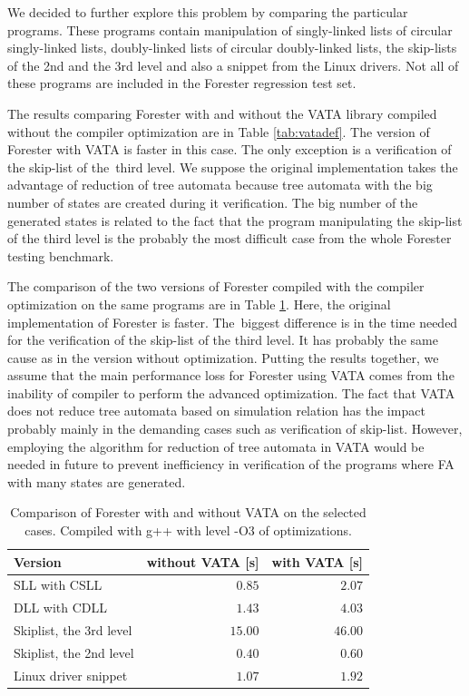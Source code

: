 We decided to further explore this problem by comparing
the particular programs.
These programs contain manipulation of singly-linked lists of
circular singly-linked lists, doubly-linked lists of
circular doubly-linked lists, the skip-lists of the 2nd and
the 3rd level and also a snippet from the Linux drivers.
Not all of these programs are included in the Forester regression test set.

The results comparing Forester with and without the VATA library compiled
without the compiler optimization are in Table \ref{tab:vatadef}.
The version of Forester with VATA is faster in this case.
The only exception is a verification of the skip-list of the~third
level.
We suppose the original implementation takes the advantage of
reduction of tree automata because tree automata
with the big number of states are created during it verification.
The big number of the generated states is related to the fact
that the program manipulating the skip-list of the third level
is the probably the most difficult case from the whole Forester testing benchmark.

The comparison of the two versions of Forester compiled with the compiler optimization
on the same programs are in Table \ref{tab:vataopt}.
Here, the original implementation of Forester is faster.
The~biggest difference is in the time needed for the verification of the skip-list of the third level.
It has probably the same cause as in the version without optimization.
Putting the results together, we assume that the main performance
loss for Forester using VATA comes from the inability of compiler
to perform the advanced optimization.
The fact that VATA does not reduce tree automata based on simulation relation
has the impact probably mainly in the demanding cases such as verification of skip-list.
However, employing the algorithm for reduction of tree automata in VATA would be
needed in future to prevent inefficiency in verification of the programs
where FA with many states are generated.

\begin{table}[bt]
	\vskip6pt
	\caption{Comparison of Forester with and without VATA on the selected cases.
		Compiled with g++ with level -O3 of optimizations.
	}
	\centering
	\begin{tabular}{|l | r | r |}
		\hline
		Version & without VATA [s] & with VATA [s] \\
		\hline
		\hline
		SLL with CSLL            & $0.85$ & $2.07$  \\
		\hline
		DLL with CDLL            & $1.43$ & $4.03$ \\
		\hline
		Skiplist, the 3rd level  & $15.00$ & $46.00$ \\
		\hline
		Skiplist, the 2nd level  & $0.40$ & $0.60$  \\
		\hline
		Linux driver snippet     & $1.07$ & $1.92$  \\ 
		\hline
	\end{tabular}
	\label{tab:vataopt}
\end{table}

